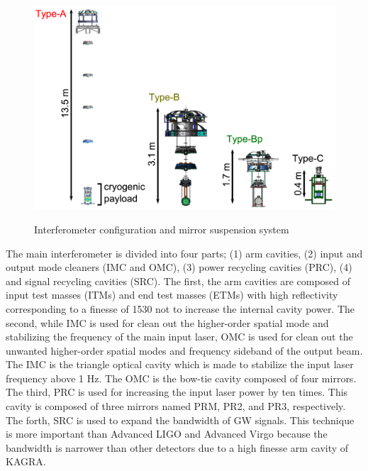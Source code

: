 \begin{figure}[p]
\begin{minipage}{15cm}
\begin{center}
      \includegraphics[width=13cm]{./img_chap6/img601b.png}
      \label{img:img601b}
    \end{center}
  \end{minipage}
  \caption{Interferometer configuration and mirror suspension system}{}
\end{figure}
The main interferometer is divided into four parts; (1) arm cavities, (2) input and output mode cleaners (IMC and OMC), (3) power recycling cavities (PRC), (4) and signal recycling cavities (SRC). The first, the arm cavities are composed of input test masses (ITMs) and end test masses (ETMs) with high reflectivity corresponding to a finesse of 1530 not to increase the internal cavity power. The second, while IMC is used for clean out the higher-order spatial mode and stabilizing the frequency of the main input laser, OMC is used for clean out the unwanted higher-order spatial modes and frequency sideband of the output beam. The IMC is the triangle optical cavity which is made to stabilize the input laser frequency above 1 Hz. The OMC is the bow-tie cavity composed of four mirrors. The third, PRC is used for increasing the input laser power by ten times. This cavity is composed of three mirrors named PRM, PR2, and PR3, respectively. The forth, SRC is used to expand the bandwidth of GW signals. This technique is more important than Advanced LIGO and Advanced Virgo because the bandwidth is narrower than other detectors due to a high finesse arm cavity of KAGRA. 

